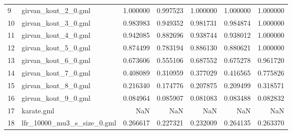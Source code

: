 \begin{tabular}{llrrrrr}
9  &         girvan\_kout\_2\_0.gml &                          1.000000 &                             0.997523 &                            1.000000 &                           1.000000 &                        1.000000 \\
10 &         girvan\_kout\_3\_0.gml &                          0.983983 &                             0.949352 &                            0.981731 &                           0.984874 &                        1.000000 \\
11 &         girvan\_kout\_4\_0.gml &                          0.942085 &                             0.882696 &                            0.938744 &                           0.938012 &                        1.000000 \\
12 &         girvan\_kout\_5\_0.gml &                          0.874499 &                             0.783194 &                            0.886130 &                           0.880621 &                        1.000000 \\
13 &         girvan\_kout\_6\_0.gml &                          0.673606 &                             0.555106 &                            0.687552 &                           0.675278 &                        0.961720 \\
14 &         girvan\_kout\_7\_0.gml &                          0.408089 &                             0.310959 &                            0.377029 &                           0.416565 &                        0.775826 \\
15 &         girvan\_kout\_8\_0.gml &                          0.216340 &                             0.174776 &                            0.207875 &                           0.209499 &                        0.318571 \\
16 &         girvan\_kout\_9\_0.gml &                          0.084964 &                             0.085907 &                            0.081083 &                           0.083488 &                        0.082832 \\
17 &                  karate.gml &                               NaN &                                  NaN &                                 NaN &                                NaN &                             NaN \\
18 &  lfr\_10000\_mu3\_s\_size\_0.gml &                          0.266617 &                             0.227321 &                            0.232009 &                           0.264135 &                        0.263370 \\

\end{tabular}
